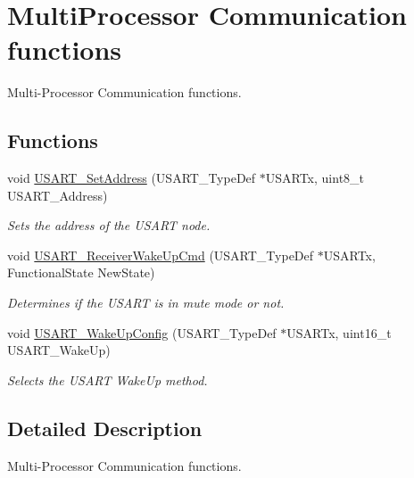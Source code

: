 \hypertarget{group___u_s_a_r_t___group3}{}\section{Multi\+Processor Communication functions}
\label{group___u_s_a_r_t___group3}


Multi-\/\+Processor Communication functions.  


\subsection*{Functions}
\begin{DoxyCompactItemize}
\item 
void \mbox{\hyperlink{group___u_s_a_r_t___group3_ga65ec9928817f3f031dd9a4dfc95d6666}{U\+S\+A\+R\+T\+\_\+\+Set\+Address}} (U\+S\+A\+R\+T\+\_\+\+Type\+Def $\ast$U\+S\+A\+R\+Tx, uint8\+\_\+t U\+S\+A\+R\+T\+\_\+\+Address)
\begin{DoxyCompactList}\small\item\em Sets the address of the U\+S\+A\+RT node. \end{DoxyCompactList}\item 
void \mbox{\hyperlink{group___u_s_a_r_t___group3_gac27b78ce445a16fe33851d2f87781c02}{U\+S\+A\+R\+T\+\_\+\+Receiver\+Wake\+Up\+Cmd}} (U\+S\+A\+R\+T\+\_\+\+Type\+Def $\ast$U\+S\+A\+R\+Tx, Functional\+State New\+State)
\begin{DoxyCompactList}\small\item\em Determines if the U\+S\+A\+RT is in mute mode or not. \end{DoxyCompactList}\item 
void \mbox{\hyperlink{group___u_s_a_r_t___group3_ga4965417c2412c36e462fcad50a8d5393}{U\+S\+A\+R\+T\+\_\+\+Wake\+Up\+Config}} (U\+S\+A\+R\+T\+\_\+\+Type\+Def $\ast$U\+S\+A\+R\+Tx, uint16\+\_\+t U\+S\+A\+R\+T\+\_\+\+Wake\+Up)
\begin{DoxyCompactList}\small\item\em Selects the U\+S\+A\+RT Wake\+Up method. \end{DoxyCompactList}\end{DoxyCompactItemize}


\subsection{Detailed Description}
Multi-\/\+Processor Communication functions. 


